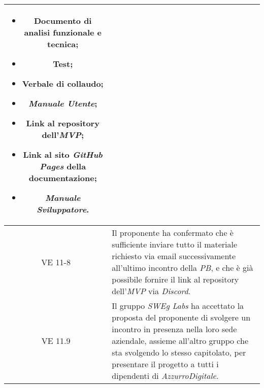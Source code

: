 \begin{table}[htbp]
\begin{tabular}{|c|p{}|}
        \begin{itemize}
            \item Documento di analisi funzionale e tecnica;
            \item Test;
            \item Verbale di collaudo;
            \item \emph{Manuale Utente};
            \item Link al repository dell'\emph{MVP};
            \item Link al sito \emph{GitHub Pages} della documentazione;
            \item \emph{Manuale Sviluppatore}.
        \end{itemize}\\ \hline
        VE 11-8 & Il proponente ha confermato che è sufficiente inviare tutto il materiale richiesto via email successivamente all'ultimo incontro della \emph{PB}, e che è già possibile fornire il link al repository dell'\emph{MVP} via \emph{Discord}.\\ \hline
        VE 11.9 & Il gruppo \emph{SWEg Labs} ha accettato la proposta del proponente di svolgere un incontro in presenza nella loro
        sede aziendale, assieme all'altro gruppo che sta svolgendo lo stesso capitolato, per presentare il progetto a tutti i dipendenti di \emph{AzzurroDigitale}.\\
        \hline
    \end{tabular}
\end{table}